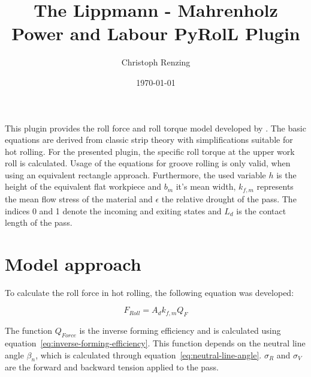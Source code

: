\documentclass[11pt]{PyRollDocs}
\begin{document}
    \title{The Lippmann - Mahrenholz Power and Labour PyRolL Plugin}
    \author{Christoph Renzing}
    \date{\today}

    \maketitle

    This plugin provides the roll force and roll torque model developed by \textcite{Lippmann_Mahrenholtz_1967}.
    The basic equations are derived from classic strip theory with simplifications suitable for hot rolling.
    For the presented plugin, the specific roll torque at the upper work roll is calculated.
    Usage of the equations for groove rolling is only valid, when using an equivalent rectangle approach.
    Furthermore, the used variable $h$ is the height of the equivalent flat workpiece and $b_m$ it's mean width,
    $k_{f,m}$ represents the mean flow stress of the material and $\epsilon$ the relative drought of the pass.
    The indices 0 and 1 denote the incoming and exiting states and $L_d$ is the contact length of the pass.


    \section{Model approach}\label{sec:model-approach}

    To calculate the roll force in hot rolling, the following equation was developed:

    \begin{equation}
        F_{Roll} = A_d k_{f,m} Q_F
        \label{eq:lippmann-mahrenholz-force}
    \end{equation}

    The function $Q_{Force}$ is the inverse forming efficiency and is calculated using equation~\eqref{eq:inverse-forming-efficiency}.
    This function depends on the neutral line angle $\beta_n$, which is calculated through equation~\eqref{eq:neutral-line-angle}.
    $\sigma_R$ and $\sigma_V$ are the forward and backward tension applied to the pass.
\end{document}
